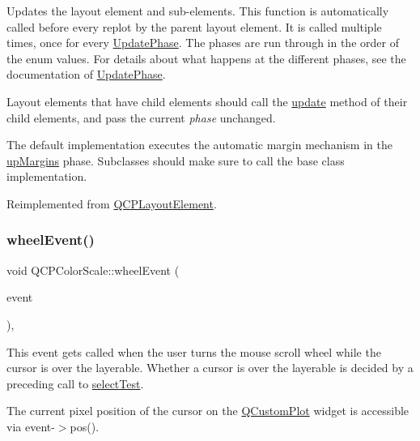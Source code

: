 Updates the layout element and sub-\/elements. This function is automatically called before every replot by the parent layout element. It is called multiple times, once for every \mbox{\hyperlink{class_q_c_p_layout_element_a0d83360e05735735aaf6d7983c56374d}{Update\+Phase}}. The phases are run through in the order of the enum values. For details about what happens at the different phases, see the documentation of \mbox{\hyperlink{class_q_c_p_layout_element_a0d83360e05735735aaf6d7983c56374d}{Update\+Phase}}.

Layout elements that have child elements should call the \mbox{\hyperlink{class_q_c_p_color_scale_a259dcb6d3053a2cc3c197e9b1191ddbe}{update}} method of their child elements, and pass the current {\itshape phase} unchanged.

The default implementation executes the automatic margin mechanism in the \mbox{\hyperlink{class_q_c_p_layout_element_a0d83360e05735735aaf6d7983c56374da288cb59a92280e47261a341f2813e676}{up\+Margins}} phase. Subclasses should make sure to call the base class implementation. 

Reimplemented from \mbox{\hyperlink{class_q_c_p_layout_element_a929c2ec62e0e0e1d8418eaa802e2af9b}{Q\+C\+P\+Layout\+Element}}.

\mbox{\label{class_q_c_p_color_scale_a63cf19be184f6670c9495ad3a9a1baeb}} 
\subsubsection{\texorpdfstring{wheel\+Event()}{wheelEvent()}}
{\footnotesize\ttfamily void Q\+C\+P\+Color\+Scale\+::wheel\+Event (\begin{DoxyParamCaption}\item[{Q\+Wheel\+Event $\ast$}]{event }\end{DoxyParamCaption})\hspace{0.3cm}{\ttfamily [protected]}, {\ttfamily [virtual]}}

This event gets called when the user turns the mouse scroll wheel while the cursor is over the layerable. Whether a cursor is over the layerable is decided by a preceding call to \mbox{\hyperlink{class_q_c_p_layout_element_ae97f483cccedadbf18ea4525ef240ee4}{select\+Test}}.

The current pixel position of the cursor on the \mbox{\hyperlink{class_q_custom_plot}{Q\+Custom\+Plot}} widget is accessible via {\ttfamily event-\/$>$pos()}.

